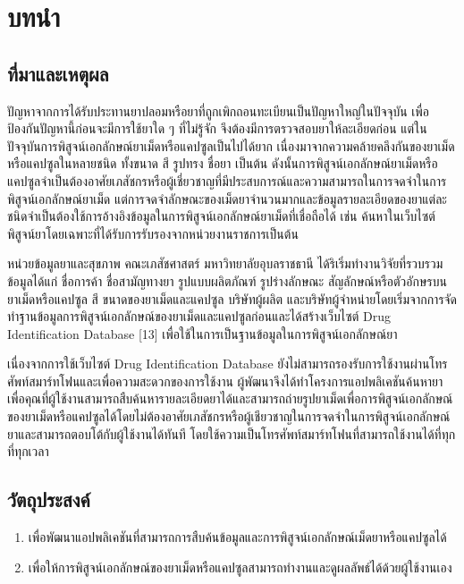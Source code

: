 \chapter{บทนำ}

\section{ที่มาและเหตุผล }
ปัญหาจากการได้รับประทานยาปลอมหรือยาที่ถูกเพิกถอนทะเบียนเป็นปัญหาใหญ่ในปัจจุบัน เพื่อป้องกันปัญหานี้ก่อนจะมีการใช้ยาใด ๆ ที่ไม่รู้จัก จึงต้องมีการตรวจสอบยาให้ละเอียดก่อน แต่ในปัจจุบันการพิสูจน์เอกลักษณ์ยาเม็ดหรือแคปซูลเป็นไปได้ยาก เนื่องมาจากความคล้ายคลึงกันของยาเม็ดหรือแคปซูลในหลายชนิด ทั้งขนาด สี รูปทรง ชื่อยา เป็นต้น ดังนั้นการพิสูจน์เอกลักษณ์ยาเม็ดหรือแคปซูลจำเป็นต้องอาศัยเภสัชกรหรือผู้เชี่ยวชาญที่มีประสบการณ์และความสามารถในการจดจำในการพิสูจน์เอกลักษณ์ยาเม็ด แต่การจดจำลักษณะของเม็ดยาจำนวนมากและข้อมูลรายละเอียดของยาแต่ละชนิดจำเป็นต้องใช้การอ้างอิงข้อมูลในการพิสูจน์เอกลักษณ์ยาเม็ดที่เชื่อถือได้ เช่น ค้นหาในเว็บไซต์พิสูจน์ยาโดยเฉพาะที่ได้รับการรับรองจากหน่วยงานราชการเป็นต้น 

หน่วยข้อมูลยาและสุขภาพ คณะเภสัชศาสตร์ มหาวิทยาลัยอุบลราชธานี ได้ริเริ่มทำงานวิจัยที่รวบรวมข้อมูลได้แก่ ชื่อการค้า ชื่อสามัญทางยา รูปแบบผลิตภัณฑ์ รูปร่างลักษณะ สัญลักษณ์หรือตัวอักษรบนยาเม็ดหรือแคปซูล สี ขนาดของยาเม็ดและแคปซูล บริษัทผู้ผลิต และบริษัทผู้จำหน่ายโดยเริ่มจากการจัดทำฐานข้อมูลการพิสูจน์เอกลักษณ์ของยาเม็ดและแคปซูลก่อนและได้สร้างเว็บไซต์ Drug Identification Database [13] เพื่อใช้ในการเป็นฐานข้อมูลในการพิสูจน์เอกลักษณ์ยา 

เนื่องจากการใช้เว็บไซต์ Drug Identification Database ยังไม่สามารถรองรับการใช้งานผ่านโทรศัพท์สมาร์ทโฟนและเพื่อความสะดวกของการใช้งาน ผู้พัฒนาจึงได้ทำโครงการแอปพลิเคชันค้นหายาเพื่อคุณที่ผู้ใช้งานสามารถสืบค้นหารายละเอียดยาได้และสามารถถ่ายรูปยาเม็ดเพื่อการพิสูจน์เอกลักษณ์ของยาเม็ดหรือแคปซูลได้โดยไม่ต้องอาศัยเภสัชกรหรือผู้เชียวชาญในการจดจำในการพิสูจน์เอกลักษณ์ยาและสามารถตอบโต้กับผู้ใช้งานได้ทันที โดยใช้ความเป็นโทรศัพท์สมาร์ทโฟนที่สามารถใช้งานได้ที่ทุกที่ทุกเวลา

\section{วัตถุประสงค์}
    
    \begin{enumerate}
        \item เพื่อพัฒนาแอปพลิเคชันที่สามารถการสืบค้นข้อมูลและการพิสูจน์เอกลักษณ์เม็ดยาหรือแคปซูลได้
        
        \item เพื่อให้การพิสูจน์เอกลักษณ์ของยาเม็ดหรือแคปซูลสามารถทำงานและดูผลลัพธ์ได้ด้วยผู้ใช้งานเอง
        
    \end{enumerate}
